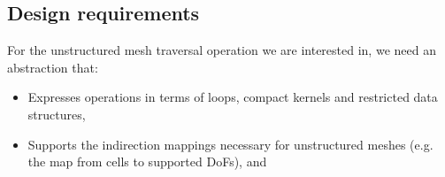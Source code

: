 \documentclass[thesis]{subfiles}
\begin{document}
\cite{stroutSparsePolyhedralFramework2018} %
\cite{mirchandaneyPrinciplesRuntimeSupport1988} %
\cite{arenazInspectorExecutorAlgorithmIrregular2004} %

\subsection{Design requirements}

For the unstructured mesh traversal operation we are interested in, we need an abstraction that:

\begin{itemize}
  \item
    Expresses operations in terms of loops, compact kernels and restricted data structures,
  \item
    Supports the indirection mappings necessary for unstructured meshes (e.g. the map from cells to supported DoFs), and
\end{itemize}



\end{document}

